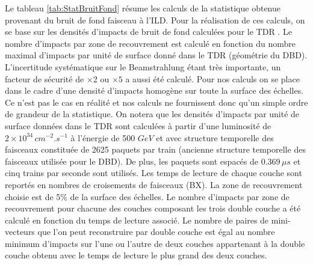   Le tableau \ref{tab:StatBruitFond} r\'esume les calculs de la statistique obtenue provenant du bruit de fond faisceau \`a l'ILD. Pour la r\'ealisation de ces calculs, on se base sur les densit\'es d'impacts de bruit de fond calcul\'ees pour le TDR \cite{Vogel:2008zza}. Le nombre d'impacts par zone de recouvrement est calcul\'e en fonction du nombre maximal d'impacts par unit\'e de surface donn\'e dans le TDR (g\'eom\'etrie du DBD). L'incertitude syst\'ematique sur le Beamstrahlung \'etant tr\`es importante, un facteur de s\'ecurit\'e de $\times$2 ou $\times5$ a aussi \'et\'e calcul\'e. Pour nos calculs on se place dans le cadre d'une densit\'e d'impacts homog\`ene sur toute la surface des \'echelles. Ce n'est pas le cas en r\'ealit\'e et nos calculs ne fournissent donc qu'un simple ordre de grandeur de la statistique. On notera que les densit\'es d'impacts par unit\'e de surface donn\'ees dans le TDR sont calcul\'ees \`a partir d'une luminosit\'e de $2 \times 10^{34} \, cm^{-2}.s^{-1}$ \`a l'\'energie de 500 $GeV$ et avec structure temporelle des faisceaux constitu\'ee de 2625 paquets par train (ancienne structure temporelle des faisceaux utilis\'ee pour le DBD). De plus, les paquets sont espac\'es de $0.369  \, \mu s$ et cinq trains par seconde sont utilis\'es. Les temps de lecture de chaque couche sont report\'es en nombres de croisements de faisceaux (BX). La zone de recouvrement choisie est de 5\% de la surface des \'echelles. Le nombre d'impacts par zone de recouvrement pour chacune des couches composant les trois double couche a \'et\'e calcul\'e en fonction du temps de lecture associ\'e. Le nombre de paires de mini-vecteurs que l'on peut reconstruire par double couche est \'egal au nombre minimum d'impacts sur l'une ou l'autre de deux couches appartenant \`a la double couche obtenu avec le temps de lecture le plus grand des deux couches.


